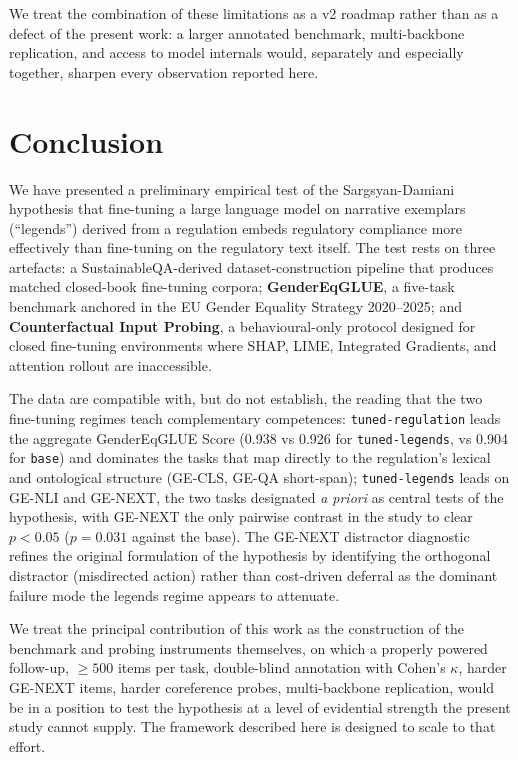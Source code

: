 \documentclass[pdflatex, sn-apa]{sn-jnl}%
\theoremstyle{thmstyleone}%
\theoremstyle{thmstyletwo}%
\theoremstyle{thmstylethree}%
\newcommand{\modelbase}{\texttt{base}}
\newcommand{\modellegends}{\texttt{tuned-legends}}
\newcommand{\modelreg}{\texttt{tuned-regulation}}
\begin{document}
We treat the combination of these limitations as a v2 roadmap rather
than as a defect of the present work: a larger annotated benchmark,
multi-backbone replication, and access to model internals would,
separately and especially together, sharpen every observation reported
here.

\section{Conclusion}
\label{sec:conclusion}

We have presented a preliminary empirical test of the Sargsyan-Damiani
hypothesis that fine-tuning a large language model on narrative
exemplars (``legends'') derived from a regulation embeds regulatory
compliance more effectively than fine-tuning on the regulatory text
itself. The test rests on three artefacts: a SustainableQA-derived
dataset-construction pipeline that produces matched closed-book
fine-tuning corpora; \textbf{GenderEqGLUE}, a five-task benchmark
anchored in the EU Gender Equality Strategy 2020--2025; and
\textbf{Counterfactual Input Probing}, a behavioural-only protocol
designed for closed fine-tuning environments where SHAP, LIME,
Integrated Gradients, and attention rollout are inaccessible.

The data are compatible with, but do not establish, the reading that
the two fine-tuning regimes teach complementary competences:
\modelreg{} leads the aggregate GenderEqGLUE Score (0.938 vs 0.926 for
\modellegends{}, vs 0.904 for \modelbase{}) and dominates the tasks
that map directly to the regulation's lexical and ontological
structure (GE-CLS, GE-QA short-span); \modellegends{} leads on GE-NLI
and GE-NEXT, the two tasks designated \emph{a priori} as central tests
of the hypothesis, with GE-NEXT the only pairwise contrast in the
study to clear $p<0.05$ ($p=0.031$ against the base). The GE-NEXT
distractor diagnostic refines the original formulation of the
hypothesis by identifying the orthogonal distractor (misdirected
action) rather than cost-driven deferral as the dominant failure mode
the legends regime appears to attenuate.

We treat the principal contribution of this work as the construction
of the benchmark and probing instruments themselves, on which a
properly powered follow-up, $\geq 500$ items per task, double-blind
annotation with Cohen's $\kappa$, harder GE-NEXT items, harder
coreference probes, multi-backbone replication, would be in a position
to test the hypothesis at a level of evidential strength the present
study cannot supply. The framework described here is designed to scale
to that effort.
\end{document}
